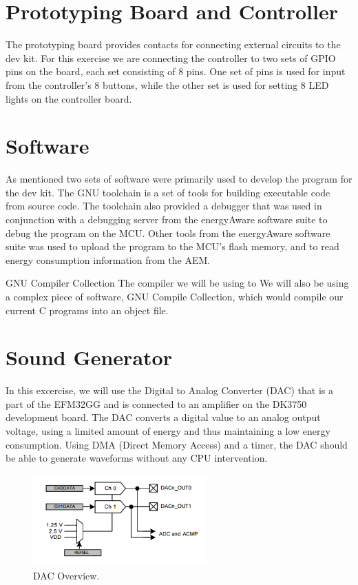 \section{Prototyping Board and Controller}

The prototyping board provides contacts for connecting external circuits to the
dev kit. \cite{DK3750Manual} For this exercise we are connecting the controller
to two sets of GPIO pins on the board, each set consisting of 8 pins. One set of
pins is used for input from the controller's 8 buttons, while the other set is
used for setting 8 LED lights on the controller board.

\section{Software}

As mentioned two sets of software were primarily used to develop the program for
the dev kit. The GNU toolchain is a set of tools for building executable code
from source code. The toolchain also provided a debugger that was used in
conjunction with a debugging server from the energyAware software suite to debug
the program on the MCU. Other tools from the energyAware software suite was used
to upload the program to the MCU's flash memory, and to read energy consumption
information from the AEM. \cite{TDT4528Compendium}

GNU Compiler Collection
The compiler we will be using to 
We will also be using a complex piece of software, GNU Compile Collection, which 
would compile our current C programs into an object file. 

\section{Sound Generator}

In this excercise, we will use the Digital to Analog Converter (DAC) that is a
part of the EFM32GG and is connected to an amplifier on the DK3750 development
board. \cite{TDT4528Compendium} The DAC converts a digital value to an analog
output voltage, using a limited amount of energy and thus maintaining a low
energy consumption. Using DMA (Direct Memory Access) and a timer, the DAC should
be able to generate waveforms without any CPU intervention. \cite{EFM32GGManual}

\begin{figure}[hb]
  \centering
  \includegraphics[height=3.5cm]{images/DAC_view}
  \caption[DAC Overview]
   {DAC Overview. \cite{EFM32GGManual}}
\end{figure}


